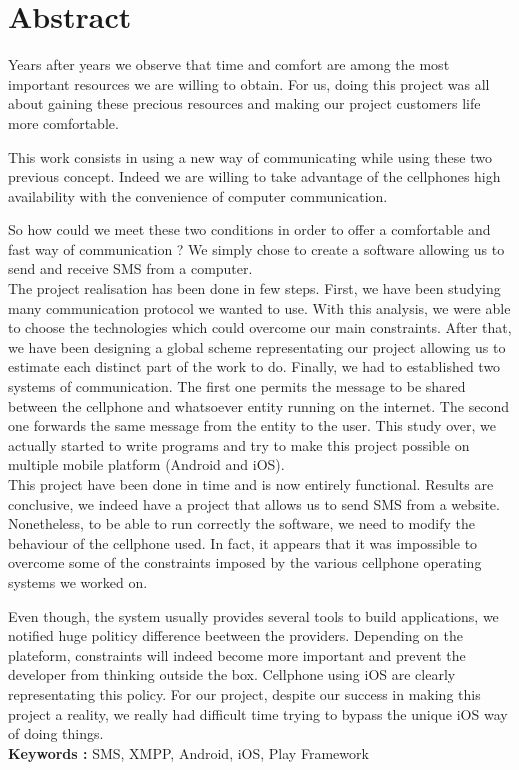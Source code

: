 \cleardoublepage



\chapter*{Abstract}

\thispagestyle{empty}



Years after years we observe that time and comfort are among the most important resources
we are willing to obtain. For us, doing this project was all about gaining these precious
resources and making our project customers life more comfortable.

This work consists in using a new way of communicating while using these two previous concept. 
Indeed we are willing to take advantage of the cellphones high availability with the convenience 
of computer communication.

So how could we meet these two conditions in order to offer a comfortable and fast way of communication ?
We simply chose to create a software allowing us to send and receive SMS from a computer.
\\


The project realisation has been done in few steps. First, we have been studying many communication protocol
we wanted to use. With this analysis, we were able to choose the technologies which could overcome our main constraints.
After that, we have been designing a global scheme representating our project allowing us to estimate
each distinct part of the work to  do. Finally, we had to established two systems of communication.
The first one permits the message to be shared between the cellphone and whatsoever entity running
on the internet. The second one forwards the same message from the entity to the user. This study
over, we actually started to write programs and try to make this project possible on multiple
mobile platform (Android and iOS).
\\


This project have been done in time and is now entirely functional. Results are conclusive,
we indeed have a project that allows us to send SMS from a website. Nonetheless, to be able 
to run correctly the software, we need to modify the behaviour of the cellphone used. In fact,
it appears that it was impossible to overcome some of the constraints imposed by the various
cellphone operating systems we worked on. 

Even though, the system usually provides several tools to build applications, we notified huge
politicy difference beetween the providers. Depending on the plateform, constraints will indeed
become more important and prevent the developer from thinking outside the box.
Cellphone using iOS are clearly representating this policy. For our project, despite our success in
making this project a reality, we really had difficult time trying to bypass the unique iOS way of doing things.
\\



\textbf{Keywords : } SMS, XMPP, Android, iOS, Play Framework
